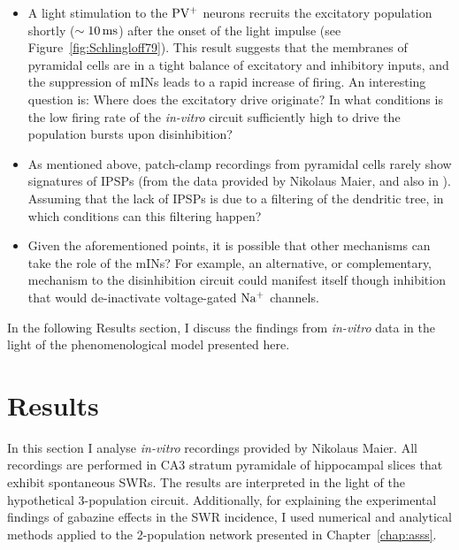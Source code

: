     \begin{itemize}
      \item A light stimulation to the $\rm PV^+$ neurons recruits the
        excitatory population shortly ($\sim 10\, \rm ms$) after the onset of
        the light impulse (see Figure~\ref{fig:Schlingloff79}). This result
        suggests that the membranes of pyramidal cells are in a tight balance
        of excitatory and inhibitory inputs, and the suppression of mINs leads
        to a rapid increase of firing. An interesting question is: Where does
        the excitatory drive originate? In what conditions is the low firing
        rate of the \textit{in-vitro} circuit sufficiently high to drive the
        population bursts upon disinhibition?
      \item As mentioned above, patch-clamp recordings from pyramidal cells
        rarely show signatures of IPSPs (from the data provided by Nikolaus
        Maier, and also in \cite{Maier2011, Schlingloff2014}). Assuming that
        the lack of IPSPs is due to a filtering of the dendritic tree, in which
        conditions can this filtering happen?
      \item Given the aforementioned points, it is possible that other
        mechanisms can take the role of the mINs? For example, an alternative,
        or complementary, mechanism to the disinhibition circuit could manifest
        itself though inhibition that would de-inactivate voltage-gated $\rm
        Na^+$ channels.
    \end{itemize}

    In the following Results section, I discuss the findings from \textit{in-vitro} data 
    in the light of the phenomenological model presented here. 

\section{Results}
\label{sec:results}
  In this section I analyse \textit{in-vitro} recordings provided by Nikolaus
  Maier. All recordings are performed in CA3 stratum pyramidale of hippocampal
  slices that exhibit spontaneous SWRs. The results are interpreted in the
  light of the hypothetical 3-population circuit. Additionally, for explaining
  the experimental findings of gabazine effects in the SWR incidence, I used
  numerical and analytical methods applied to the 2-population network
  presented in Chapter~\ref{chap:asss}.
 
